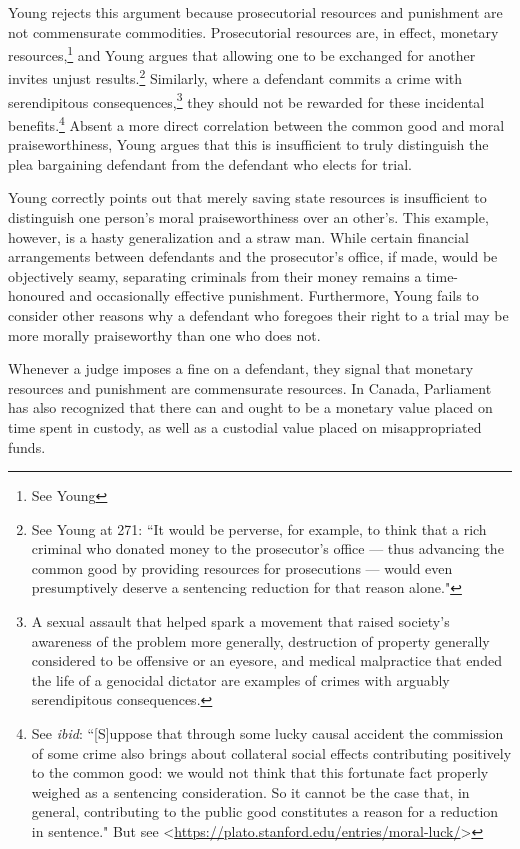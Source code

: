 Young rejects this argument because prosecutorial resources and punishment are not commensurate commodities. Prosecutorial resources are, in effect, monetary resources,\footnote{See Young} and Young argues that allowing one to be exchanged for another invites unjust results.\footnote{See Young at 271: ``It would be perverse, for example, to think that a rich criminal who donated money to the prosecutor's office — thus advancing the common good by providing resources for prosecutions — would even presumptively deserve a sentencing reduction for that reason alone."} Similarly, where a defendant commits a crime with serendipitous consequences,\footnote{A sexual assault that helped spark a movement that raised society's awareness of the problem more generally, destruction of property generally considered to be offensive or an eyesore, and medical malpractice that ended the life of a genocidal dictator are examples of crimes with arguably serendipitous consequences.} they should not be rewarded for these incidental benefits.\footnote{See \textit{ibid}: ``[S]uppose that through some lucky causal accident the commission of some crime also brings about collateral social effects contributing positively to the common good: we would not think that this fortunate fact properly weighed as a sentencing consideration. So it cannot be the case that, in general, contributing to the public good constitutes a reason for a reduction in sentence." But see \textless \url{https://plato.stanford.edu/entries/moral-luck/}\textgreater} Absent a more direct correlation between the common good and moral praiseworthiness, Young argues that this is insufficient to truly distinguish the plea bargaining defendant from the defendant who elects for trial.

Young correctly points out that merely saving state resources is insufficient to distinguish one person's moral praiseworthiness over an other's. This example, however, is a hasty generalization and a straw man. While certain financial arrangements between defendants and the prosecutor's office, if made, would be objectively seamy, separating criminals from their money remains a time-honoured and occasionally effective punishment. Furthermore, Young fails to consider other reasons why a defendant who foregoes their right to a trial may be more morally praiseworthy than one who does not.

Whenever a judge imposes a fine on a defendant, they signal that monetary resources and punishment are commensurate resources. In Canada, Parliament has also recognized that there can and ought to be a monetary value placed on time spent in custody, as well as a custodial value placed on misappropriated funds.

